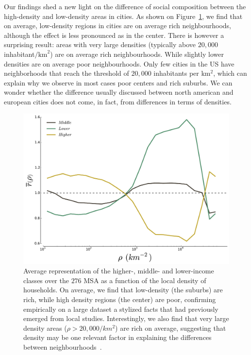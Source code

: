Our findings shed a new light on the difference of social composition
between the high-density and low-density areas in cities. As shown on
Figure~\ref{fig:high_low_densities}, we find that on average,
low-density regions in cities are on average rich neighbourhoods,
although the effect is less pronounced as in the center. There is
however a surprising result: areas with very large densities
(typically above $20,000$ inhabitant$/\text{km}^2$) are on average
rich neighbourhoods. While slightly lower densities are on average poor
neighbourhoods. Only few cities in the US have neighborhoods that
reach the threshold of $20,000$ inhabitants per km$^2$, which can
explain why we observe in most cases poor centers and rich suburbs. We
can wonder whether the difference usually discussed between north
american and european cities does not come, in fact, from differences
in terms of densities. 
\begin{figure}
    \centering
    \includegraphics[width=\textwidth]{gfx/chapter-segregation/figure4.pdf}
    \caption{Average representation of the higher-, middle- and
      lower-income classes over the $276$ MSA as a function of the
      local density of households. On average, we find that low-density (the
  suburbs) are rich, while high density regions (the center) are poor,
  confirming empirically on a large dataset a stylized facts that had previously
  emerged from local studies. Interestingly, we also
  find that  very large density areas ($\rho>20,000/km^2$) are rich on average,
  suggesting that density may be one relevant factor in explaining the
  differences between neighbourhoods~\cite{Jacobs:1961}.
  \label{fig:high_low_densities}} 
  \end{figure}

